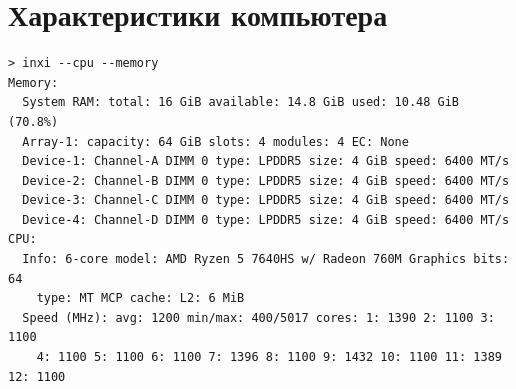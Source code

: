 \documentclass[a4paper, 14pt]{extarticle}
\begin{document}
\section*{Характеристики компьютера}

\begin{lstlisting}[caption={Характеристики компьютера}, label={lst:computer_specs}]
> inxi --cpu --memory
Memory:
  System RAM: total: 16 GiB available: 14.8 GiB used: 10.48 GiB (70.8%)
  Array-1: capacity: 64 GiB slots: 4 modules: 4 EC: None
  Device-1: Channel-A DIMM 0 type: LPDDR5 size: 4 GiB speed: 6400 MT/s
  Device-2: Channel-B DIMM 0 type: LPDDR5 size: 4 GiB speed: 6400 MT/s
  Device-3: Channel-C DIMM 0 type: LPDDR5 size: 4 GiB speed: 6400 MT/s
  Device-4: Channel-D DIMM 0 type: LPDDR5 size: 4 GiB speed: 6400 MT/s
CPU:
  Info: 6-core model: AMD Ryzen 5 7640HS w/ Radeon 760M Graphics bits: 64
    type: MT MCP cache: L2: 6 MiB
  Speed (MHz): avg: 1200 min/max: 400/5017 cores: 1: 1390 2: 1100 3: 1100
    4: 1100 5: 1100 6: 1100 7: 1396 8: 1100 9: 1432 10: 1100 11: 1389 12: 1100
\end{lstlisting}
\end{document}
